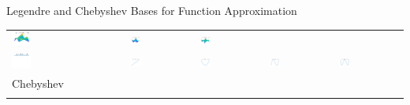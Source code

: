 \documentclass[11pt,compress,xcolor={usenames,dvipsnames},aspectratio=169]{beamer}
\begin{document}
\begin{frame}{Legendre and Chebyshev Bases for Function Approximation}
\begin{tabular}{>{\centering}m{}>{\centering}m{}>{\centering}m{}>{\centering}m{}>{\centering}m{}}
\includegraphics[width =0.18\textwidth]{ProgramsImages/Legendre_Degree_1_3.png}  &
\includegraphics[width =0.18\textwidth]{ProgramsImages/Legendre_Degree_2_2.png}  &
\includegraphics[width =0.18\textwidth]{ProgramsImages/Legendre_Degree_2_3.png} 
\tabularnewline[0ex]
		\includegraphics[width =0.18\textwidth]{ProgramsImages/Chebyshev_Degree_0.png}  &
\includegraphics[width =0.18\textwidth]{ProgramsImages/Chebyshev_Degree_1.png}  &
\includegraphics[width =0.18\textwidth]{ProgramsImages/Chebyshev_Degree_2.png}  &
\includegraphics[width =0.18\textwidth]{ProgramsImages/Chebyshev_Degree_3.png}  &
\includegraphics[width =0.18\textwidth]{ProgramsImages/Chebyshev_Degree_4.png} 
\tabularnewline[-7ex]
Chebyshev \tabularnewline
\tabularnewline

\end{tabular}
\end{frame}
\end{document}
